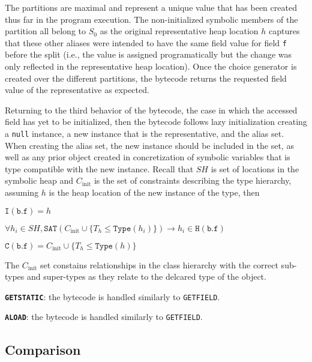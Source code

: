 The partitions are maximal and represent a unique value that has been created thus far in the program execution. The non-initialized symbolic members of the partition all belong to $S_0$ as the original representative heap location $h$ captures that these other aliases were intended to have the same field value for field \texttt{f} before the split (i.e., the value is assigned programatically but the change was only reflected in the representative heap location). Once the choice generator is created over the different partitions, the bytecode returns the requested field value of the representative as expected.

Returning to the third behavior of the bytecode, the case in which the accessed field has yet to be initialized, then the bytecode follows lazy initialization creating a \texttt{null} instance, a new instance that is the representative, and the alias set. When creating the alias set, the new instance should be included in the set, as well as any prior object created in concretization of symbolic variables that is type compatible with the new instance. Recall that $\mathit{SH}$ is set of locations in the symbolic heap and $C_\mathrm{init}$ is the set of constraints describing the type hierarchy, assuming $h$ is the heap location of the new instance of the type, then 
\begin{compactitem}
\item $\mathtt{I}(\mathtt{b.f}) = h$
\item $\forall h_i \in \mathit{SH}, \mathtt{SAT}(C_\mathrm{init} \cup \{T_h \leq \mathtt{Type}(h_i)\}) \rightarrow h_i \in \mathtt{H}(\mathtt{b.f})$  
\item $\mathtt{C}(\mathtt{b.f}) = C_\mathrm{init} \cup \{T_h \leq \mathtt{Type}(h)\}$  
\end{compactitem}
The $C_\mathrm{init}$ set constains relationships in the class hierarchy with the correct sub-types and super-types as they relate to the delcared type of the object.

\noindent \textbf{\texttt{GETSTATIC}}: the bytecode is handled similarly to \texttt{GETFIELD}. 

\noindent \textbf{\texttt{ALOAD}}: the bytecode is handled similarly to \texttt{GETFIELD}. 

\subsection{Comparison}

